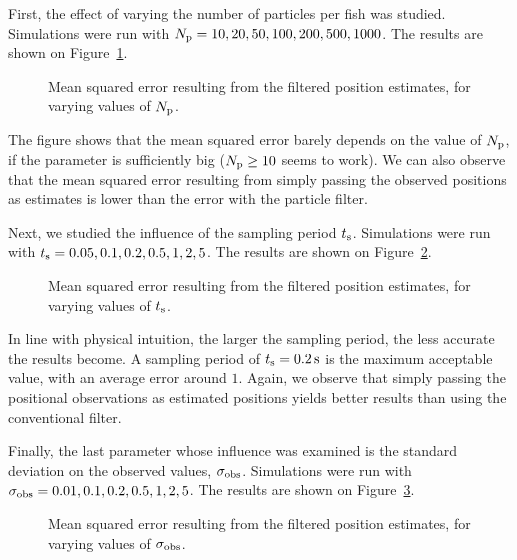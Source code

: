 \documentclass[final]{aomart}
\newtheorem[{}\it]{thm}{Theorem}[section]
\theoremstyle{definition}
\newtheorem*[{}\it]{notation}{Notation}
\numberwithin{equation}{section}
\newcommand{\ts}{t_\textnormal{s}}
\newcommand{\np}{N_\textnormal{p}}
\begin{document}
First, the effect of varying the number of particles per fish was studied.
Simulations were run with \(\np = 10, 20, 50, 100, 200, 500, 1000\).
The results are shown on Figure~\ref{fig:Np}.
\begin{figure}[!htbp]
	\centering
	\scalebox{0.75}{}
	\caption{Mean squared error resulting from the filtered position estimates, for varying values of \(\np\).}
	\label{fig:Np}
\end{figure}
The figure shows that the mean squared error barely depends on the value of \(\np\), if the parameter is sufficiently big (\(\np \ge 10\) seems to work).
We can also observe that the mean squared error resulting from simply passing the observed positions as estimates is lower than the error with the particle filter.

Next, we studied the influence of the sampling period \(\ts\).
Simulations were run with \(\ts = 0.05, 0.1, 0.2, 0.5, 1, 2, 5\).
The results are shown on Figure~\ref{fig:t_s}.
\begin{figure}[!htbp]
	\centering
	\scalebox{0.75}{}
	\caption{Mean squared error resulting from the filtered position estimates, for varying values of \(\ts\).}
	\label{fig:t_s}
\end{figure}
In line with physical intuition, the larger the sampling period, the less accurate the results become.
A sampling period of \(\ts = \SI{0.2}{\second}\) is the maximum acceptable value, with an average error around \(1\).
Again, we observe that simply passing the positional observations as estimated positions yields better results than using the conventional filter.

Finally, the last parameter whose influence was examined is the standard deviation on the observed values, \(\sigma_\textnormal{obs}\).
Simulations were run with \(\sigma_{\textnormal{obs}} = 0.01, 0.1, 0.2, 0.5, 1, 2, 5\).
The results are shown on Figure~\ref{fig:sigma_obs}.
\begin{figure}[!htbp]
	\centering
	\scalebox{0.75}{}
	\caption{Mean squared error resulting from the filtered position estimates, for varying values of \(\sigma_\textnormal{obs}\).}
	\label{fig:sigma_obs}
\end{figure}
\end{document}

